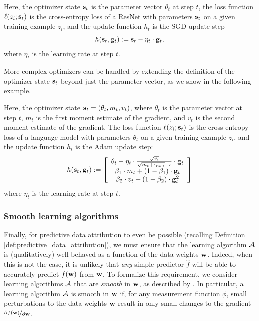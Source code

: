 \begin{example}
  Here, the optimizer state $\mathbf{s}_{t}$ is the parameter vector
  $\theta_t$ at step $t$,
  the loss function $\ell(z_i; \mathbf{s}_{t})$ is the cross-entropy loss of a ResNet
  with parameters $\mathbf{s}_{t}$ on a given training example $z_i$,
  and the update function $h_t$ is the SGD update step
  $$h(\mathbf{s}_{t}, \mathbf{g}_t) := \mathbf{s}_{t} - \eta_t \cdot \mathbf{g}_t,$$
  where $\eta_t$ is the learning rate at step $t$.
\end{example}

\noindent More complex optimizers can be handled by extending the definition
of the optimizer state $\mathbf{s}_{t}$ beyond just the parameter vector,
as we show in the following example.
\begin{example}
  Here, the optimizer state $\mathbf{s}_{t} = (\theta_t, m_t, v_t)$,
  where $\theta_t$ is the parameter vector at step $t$,
  $m_t$ is the first moment estimate of the gradient,
  and $v_t$ is the second moment estimate of the gradient.
  The loss function $\ell(z_i; \mathbf{s}_{t})$ is the cross-entropy loss of a language
  model with parameters $\theta_t$ on a given training example $z_i$,
  and the update function $h_t$ is the Adam update step:
  $$h(\mathbf{s}_{t}, \mathbf{g}_t) := \left[
    \begin{array}{c}
      \theta_t - \eta_t \cdot \frac{\sqrt{v_t}}{\sqrt{m_t +
        \epsilon_{\mathrm{root}}} +
      \epsilon} \cdot \mathbf{g}_t \\
      \beta_1 \cdot m_t + (1 - \beta_1) \cdot \mathbf{g}_t \\
      \beta_2 \cdot v_t + (1 - \beta_2) \cdot \mathbf{g}_t^2
    \end{array}
  \right]$$
  where $\eta_t$ is the learning rate at step $t$.
\end{example}



\subsubsection{Smooth learning algorithms}
Finally, for predictive data attribution to even be possible (recalling
Definition \ref{def:predictive_data_attribution}), we must ensure that the
learning algorithm $\mathcal{A}{}$ is (qualitatively) well-behaved as a function of the
data weights $\mathbf{w}$.
Indeed, when this is not the case,
it is unlikely that {\em any} simple predictor $\hat{f}$
will be able to accurately predict $f(\mathbf{w})$ from $\mathbf{w}$.
To formalize this requirement, we consider learning algorithms $\mathcal{A}{}$ that are
{\em smooth} in $\mathbf{w}$, as described by \citet{engstrom2025optimizing}.
In particular, a learning algorithm $\mathcal{A}{}$ is smooth in $\mathbf{w}$ if,
for any measurement function $\phi$, small perturbations to the data weights
$\mathbf{w}$ result in only small changes to the gradient
$\nicefrac{\partial f(\mathbf{w})}{\partial \mathbf{w}}$.

